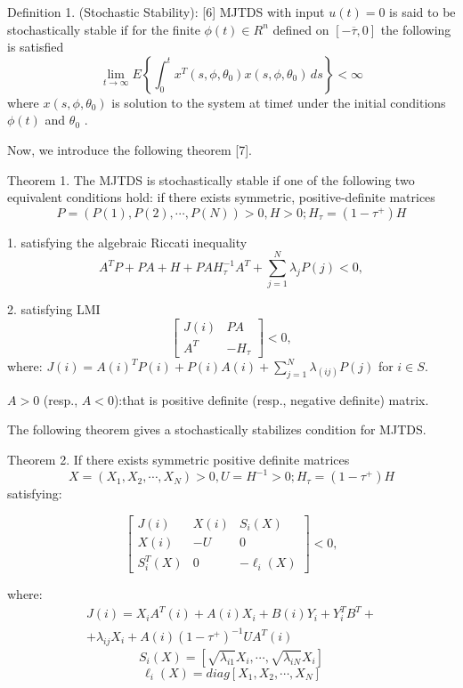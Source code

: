 Definition 1. (Stochastic Stability): [6] MJTDS with input $u(t)=0$ is said to be stochastically stable if for the finite $\phi(t)\in R^n$ defined on $[-\overline \tau,0]$ the following is satisfied
\begin{equation}
\lim_{t\to\infty} E\left\{\int_{0}^{t} x^T(s,\phi,\theta_0)x(s,\phi,\theta_0) \,ds\right\}<\infty
\end{equation}
where $x(s,\phi,\theta_0)$ is solution to the system at time$t$ under the initial conditions $\phi(t)$  and $\theta_0 $ .

Now, we introduce the following theorem [7].

Theorem 1. The MJTDS is stochastically stable if one of the following two equivalent conditions hold:
if there exists symmetric, positive-definite matrices
\begin{equation}
P=(P(1),P(2),\cdots,P(N))>0 ,H>0; H_\tau =(1-\tau^+)H
\end{equation}

1. satisfying the algebraic Riccati inequality
\begin{equation}
A^TP+PA+H+PAH_\tau^{-1} A^T +\sum_{j=1}^{N}\lambda_jP(j)<0,
\end{equation}

2. satisfying LMI
\begin{equation}
\begin{bmatrix}
J(i) & PA\\
A^T & -H_\tau
\end{bmatrix} <0,
\end{equation}
where:
 $J(i)=A(i)^TP(i)+P(i)A(i)+\sum_{j=1}^{N}\lambda_(ij)P(j)$ for $i \in S$.

$A>0$ (resp., $A<0$):that is positive definite (resp., negative definite) matrix.

The following theorem gives a stochastically stabilizes condition for MJTDS.

Theorem 2. If there exists symmetric positive definite matrices
$$X=(X_1,X_2,\cdots,X_N)>0 ,U=H^{-1}>0; H_\tau =(1-\tau^+)H$$ satisfying:

\begin{equation}
\begin{bmatrix}
J(i) & X(i) & S_i(X)\\
X(i) & -U & 0 \\
S_i^T(X) & 0 & -\ell_i(X)
\end{bmatrix} <0,
\end{equation}

where:
\begin{multline*}
	J(i)=X_iA^T(i)+A(i)X_i+B(i)Y_i+Y_i^TB^T+
	\\+
	\lambda_{ij}X_i+A(i)(1-\tau^+)^{-1}UA^T(i)
\end{multline*}
$$S_i(X)=[\sqrt{\lambda_{i1}}X_i,\cdots,\sqrt{\lambda_{iN}}X_i]$$
$$\ell_i(X)=diag[X_1,X_2,\cdots,X_N]$$

